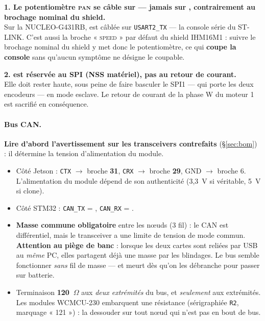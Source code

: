 \documentclass[11pt,a4paper]{article}
\begin{document}
\begin{avertissement}
\textbf{1. Le potentiomètre \textsc{pan} se câble sur  — jamais sur
, contrairement au brochage nominal du shield.}\\
Sur la NUCLEO-G431RB,  est câblée sur \texttt{USART2\_TX} — la console série du
ST-LINK. C'est aussi la broche « \textsc{speed} » par défaut du shield IHM16M1 : suivre le
brochage nominal du shield y met donc le potentiomètre, ce qui \textbf{coupe la console} sans
qu'aucun symptôme ne désigne le coupable.

\medskip
\textbf{2.  est réservée au SPI (NSS matériel), pas au retour de courant.}\\
Elle doit rester haute, sous peine de faire basculer le SPI1 — qui porte les deux encodeurs
— en mode esclave. Le retour de courant de la phase W du moteur 1 est sacrifié en
conséquence.
\end{avertissement}

\paragraph{Bus CAN.} \textbf{Lire d'abord l'avertissement sur les transceivers contrefaits}
(§\ref{sec:bom}) : il détermine la tension d'alimentation du module.
\begin{itemize}[nosep]
  \item Côté Jetson : \texttt{CTX} $\rightarrow$ broche \textbf{31}, \texttt{CRX}
        $\rightarrow$ broche \textbf{29}, GND $\rightarrow$ broche 6. L'alimentation du module
        dépend de son authenticité (3,3~V si véritable, 5~V si clone).
  \item Côté STM32 : \texttt{CAN\_TX} = , \texttt{CAN\_RX} = .
  \item \textbf{Masse commune obligatoire} entre les n\oe uds (3\ieme{} fil) : le CAN est
        différentiel, mais le transceiver a une limite de tension de mode commun.
        \textbf{Attention au piège de banc} : lorsque les deux cartes sont reliées par USB au
        \emph{même} PC, elles partagent déjà une masse par les blindages. Le bus semble
        fonctionner \emph{sans} fil de masse — et meurt dès qu'on les débranche pour passer
        sur batterie.
  \item Terminaison \textbf{120~$\Omega$} aux \emph{deux extrémités} du bus, et
        \emph{seulement} aux extrémités. Les modules WCMCU-230 embarquent une résistance
        (sérigraphiée \texttt{R2}, marquage « 121 ») : la dessouder sur tout n\oe ud qui
        n'est pas en bout de bus.
\end{itemize}
\end{document}
